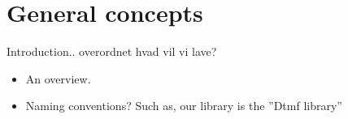 \chapter{General concepts}\label{chap:general}
Introduction.. overordnet hvad vil vi lave?
\begin{itemize}
 \item An overview.
 \item Naming conventions? Such as, our library is the ''Dtmf library''
\end{itemize}


